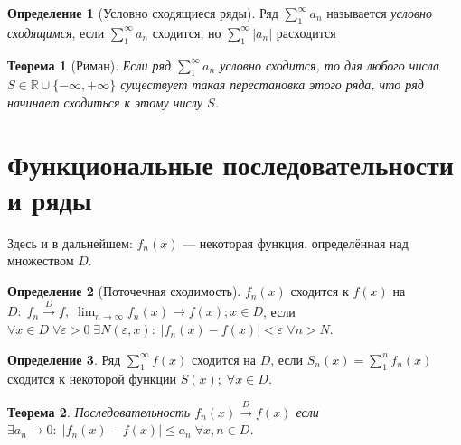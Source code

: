 \documentclass[a4paper,12pt]{article}
\newtheorem*{theorem}{Теорема}
\theoremstyle{remark}
\theoremstyle{definition}
\newtheorem{definition}{Определение}
\begin{document}
\begin{definition}[Условно сходящиеся ряды]
    Ряд \(\sum_1^\infty a_n\) называется \emph{условно сходящимся}, если \(\sum_1^\infty a_n\) сходится, но \(\sum_1^\infty |a_n|\) расходится
\end{definition}

\begin{theorem}[Риман]
    Если ряд \(\sum_1^\infty a_n\) условно сходится, то для любого числа \({S \in \mathbb{R} \cup \{-\infty, +\infty\}}\) существует такая перестановка этого ряда, что ряд начинает сходиться к этому числу \(S\).
\end{theorem}

\section*{Функциональные последовательности и ряды}

Здесь и в дальнейшем: \(f_n (x)\) --- некоторая функция, определённая над множеством \(D\).

\begin{definition}[Поточечная сходимость]
    \(f_n (x)\) сходится к \(f(x)\) на \(D:\; f_n \xrightarrow{D} f,\; \lim_{n \rightarrow \infty} f_n (x) \rightarrow f(x); x \in D\), если \(\forall x \in D\; \forall \varepsilon > 0\; \exists N(\varepsilon, x):\; |f_n(x) - f(x)| < \varepsilon\; \forall n > N\).
\end{definition}

\begin{definition}
    Ряд \(\sum_1^\infty f(x)\) сходится на \(D\), если \(S_n (x) = \sum_1^n f_n(x)\) сходится к некоторой функции \(S(x);\; \forall x \in D\).
\end{definition}

\begin{theorem}
    Последовательность \(f_n(x) \xrightarrow{D} f(x)\) если \(\exists a_n \rightarrow 0:\; |f_n(x) - f(x)| \leqslant a_n\; \forall x,n \in D\).
\end{theorem}
\end{document}
